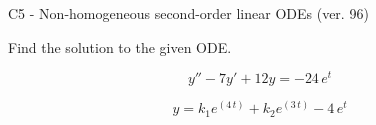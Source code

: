 \begin{exercise}
  \begin{exerciseTitle}C5 - Non-homogeneous second-order linear ODEs (ver. 96)\end{exerciseTitle}
  \begin{exerciseStatement}
    
Find the solution to the given ODE.

    
\[y''-7y'+12y = -24 \, e^{t}\]

  \end{exerciseStatement}
  \begin{exerciseAnswer}
    
\[y= k_{1} e^{\left(4 \, t\right)} + k_{2} e^{\left(3 \, t\right)} - 4 \, e^{t}\]

  \end{exerciseAnswer}
\end{exercise}